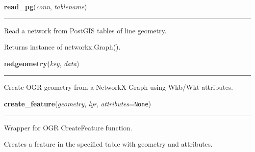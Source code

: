     \label{nx_pg:read_pg}

    \vspace{0.5ex}

\hspace{.8\funcindent}\begin{boxedminipage}{\funcwidth}

    \raggedright \textbf{read\_pg}(\textit{conn}, \textit{tablename})

    \vspace{-1.5ex}

    \rule{\textwidth}{0.5\fboxrule}
\setlength{\parskip}{2ex}
    Read a network from PostGIS tables of line geometry.

    Returns instance of networkx.Graph().

\setlength{\parskip}{1ex}
    \end{boxedminipage}

    \label{nx_pg:netgeometry}

    \vspace{0.5ex}

\hspace{.8\funcindent}\begin{boxedminipage}{\funcwidth}

    \raggedright \textbf{netgeometry}(\textit{key}, \textit{data})

    \vspace{-1.5ex}

    \rule{\textwidth}{0.5\fboxrule}
\setlength{\parskip}{2ex}
    Create OGR geometry from a NetworkX Graph using Wkb/Wkt attributes.

\setlength{\parskip}{1ex}
    \end{boxedminipage}

    \label{nx_pg:create_feature}

    \vspace{0.5ex}

\hspace{.8\funcindent}\begin{boxedminipage}{\funcwidth}

    \raggedright \textbf{create\_feature}(\textit{geometry}, \textit{lyr}, \textit{attributes}={\tt None})

    \vspace{-1.5ex}

    \rule{\textwidth}{0.5\fboxrule}
\setlength{\parskip}{2ex}
    Wrapper for OGR CreateFeature function.

    Creates a feature in the specified table with geometry and attributes.

\setlength{\parskip}{1ex}
    \end{boxedminipage}

